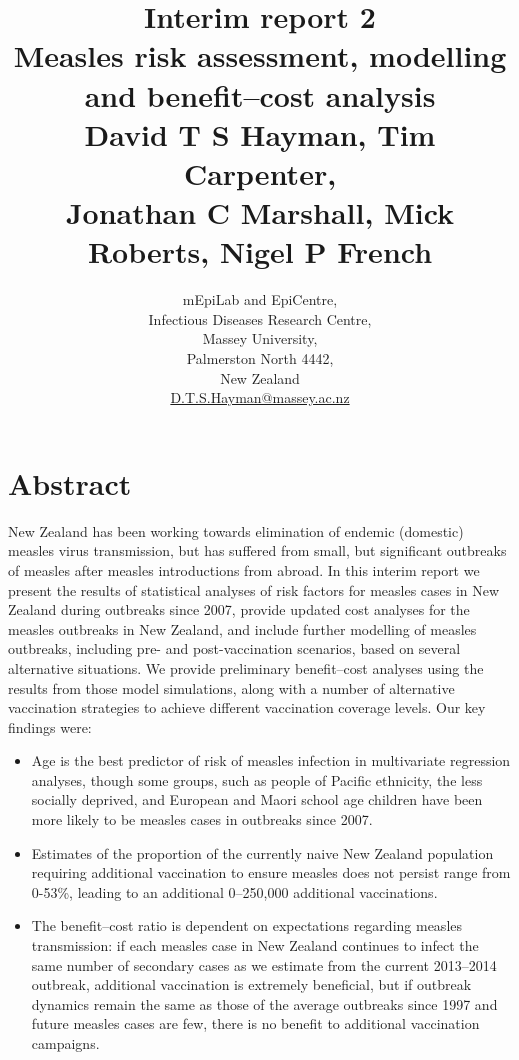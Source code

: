 \documentclass{article}
\begin{document}


\title{Interim report 2\\ Measles risk assessment, modelling and benefit--cost analysis\\ \vspace{2 mm} {\large David T S Hayman, Tim Carpenter,\\ Jonathan C Marshall, Mick Roberts, Nigel P French}}
\author{mEpiLab and EpiCentre,\\ Infectious Diseases Research Centre,\\
Massey University,\\
Palmerston North 4442,\\
New Zealand\\
\href{mailto: D.T.S.Hayman@massey.ac.nz}{D.T.S.Hayman@massey.ac.nz}}  %
\maketitle

\section{Abstract}

New Zealand has been working towards elimination of endemic (domestic) measles virus transmission, but has suffered from small, but significant outbreaks of measles after measles introductions from abroad. In this interim report we present the results of statistical analyses of risk factors for measles cases in New Zealand during outbreaks since 2007, provide updated cost analyses for the measles outbreaks in New Zealand, and include further modelling of measles outbreaks, including pre- and post-vaccination scenarios, based on several alternative situations. We provide preliminary benefit--cost analyses using the results from those model simulations, along with a number of alternative vaccination strategies to achieve different vaccination coverage levels. Our key findings were:
\begin{itemize}
\item Age is the best predictor of risk of measles infection in multivariate regression analyses, though some groups, such as people of Pacific ethnicity, the less socially deprived, and European and Maori school age children have been more likely to be measles cases in outbreaks since 2007.
\item Estimates of the proportion of the currently naive New Zealand population requiring additional vaccination to ensure measles does not persist range from 0-53\%, leading to an additional 0--250,000 additional vaccinations.
\item The benefit--cost ratio is dependent on expectations regarding measles transmission: if each measles case in New Zealand continues to infect the same number of secondary cases as we estimate from the current 2013--2014 outbreak, additional vaccination is extremely beneficial, but if outbreak dynamics remain the same as those of the average outbreaks since 1997 and future measles cases are few, there is no benefit to additional vaccination campaigns.
\end{itemize}
\end{document}
